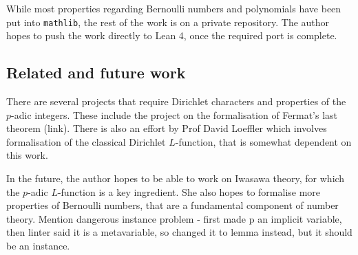 \documentclass[a4paper,UKenglish,cleveref, autoref, thm-restate]{lipics-v2021}
\newcommand{\lean}[1]{\texttt{#1}\xspace} %
\begin{document}
While most properties regarding Bernoulli numbers and polynomials have been put into \lean{mathlib}, the rest of the work is on a private repository. The author hopes to push the 
work directly to Lean 4, once the required port is complete.

\subsection{Related and future work} %
There are several projects that require Dirichlet characters and properties of the $p$-adic integers. These include the project on the formalisation of Fermat's last theorem (link). 
There is also an effort by Prof David Loeffler which involves formalisation of the classical Dirichlet $L$-function, that is somewhat dependent on this work. 

In the future, the author hopes to be able to work on Iwasawa theory, for which the $p$-adic $L$-function is a key ingredient. She also hopes to formalise more properties of Bernoulli numbers, 
that are a fundamental component of number theory.
 Mention dangerous instance problem - first made p an implicit variable, then linter said it is a metavariable, so changed it to lemma instead, but it should be an instance.

\end{document}
